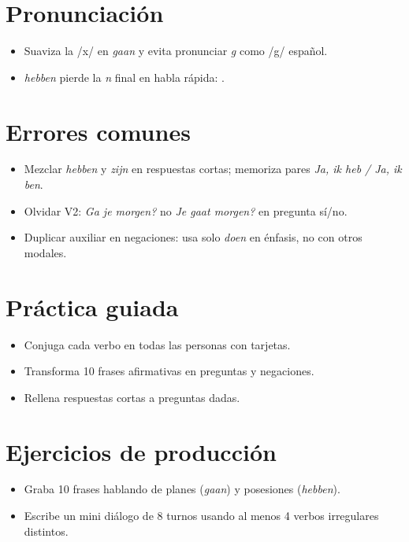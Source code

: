 \section{Pronunciación}
\begin{itemize}[leftmargin=*]
	\item Suaviza la /x/ en \textit{gaan} y evita pronunciar \textit{g} como /g/ español.
	\item \textit{hebben} pierde la \textit{n} final en habla rápida: .
\end{itemize}

\section{Errores comunes}
\begin{itemize}[leftmargin=*]
	\item Mezclar \textit{hebben} y \textit{zijn} en respuestas cortas; memoriza pares \textit{Ja, ik heb / Ja, ik ben}.
	\item Olvidar V2: \textit{Ga je morgen?} no \textit{Je gaat morgen?} en pregunta sí/no.
	\item Duplicar auxiliar en negaciones: usa solo \textit{doen} en énfasis, no con otros modales.
\end{itemize}

\section{Práctica guiada}
\begin{itemize}[leftmargin=*]
	\item Conjuga cada verbo en todas las personas con tarjetas.
	\item Transforma 10 frases afirmativas en preguntas y negaciones.
	\item Rellena respuestas cortas a preguntas dadas.
\end{itemize}

\section{Ejercicios de producción}
\begin{itemize}[leftmargin=*]
	\item Graba 10 frases hablando de planes (\textit{gaan}) y posesiones (\textit{hebben}).
	\item Escribe un mini diálogo de 8 turnos usando al menos 4 verbos irregulares distintos.
\end{itemize}

